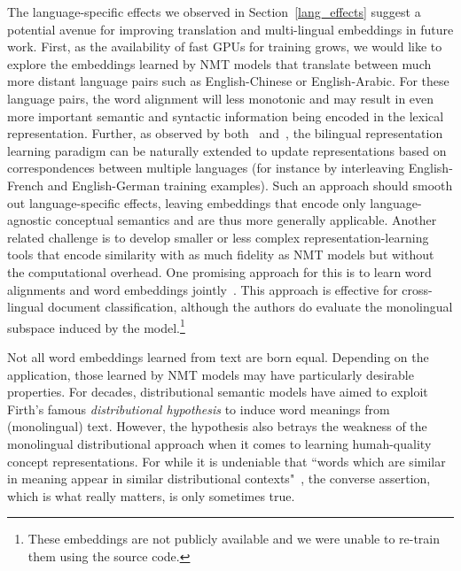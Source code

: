 The language-specific effects we observed in Section~\ref{lang_effects} suggest a potential avenue for improving translation and multi-lingual embeddings in future work. First, as the availability of fast GPUs for training grows, we would like to explore the embeddings learned by NMT models that translate between much more distant language pairs such as English-Chinese or English-Arabic. For these language pairs, the word alignment will less monotonic and may result in even more important semantic and syntactic information being encoded in the lexical representation. Further,  as observed by both~\cite{Hermann:2014:ICLR} and~\cite{faruqui2014improving}, the bilingual representation learning paradigm can be naturally extended to update representations based on correspondences between multiple languages (for instance by interleaving English-French and English-German training examples). Such an approach should smooth out language-specific effects, leaving embeddings that encode only language-agnostic conceptual semantics and are thus more generally applicable. Another related challenge is to develop smaller or less complex representation-learning tools that encode similarity with as much fidelity as NMT models but without the computational overhead. One promising approach for this is to learn word alignments and word embeddings jointly~\cite{Kocisky:2014}. This approach is effective for cross-lingual document classification, although the authors do evaluate the monolingual subspace induced by the model.\footnote{These embeddings are not publicly available and we were unable to re-train them using the source code.}

Not all word embeddings learned from text are born equal. Depending on the application, those learned by NMT models may have particularly desirable properties. For decades, distributional semantic models have aimed to exploit Firth's famous \emph{distributional hypothesis} to induce word meanings from (monolingual) text. However, the hypothesis also betrays the weakness of the monolingual distributional approach when it comes to learning humah-quality concept representations. For while it is undeniable that ``words which are similar in meaning appear in similar distributional contexts"~\cite{dist}, the converse assertion, which is what really matters, is only sometimes true. 




